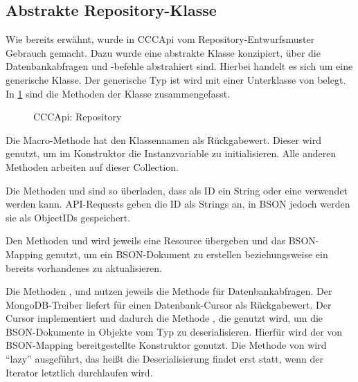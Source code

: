 \subsection{Abstrakte Repository-Klasse}
\label{ssec:ba_abstrakte_repository_klasse}

Wie bereits erwähnt, wurde in CCCApi vom Repository-Entwurfsmuster Gebrauch
gemacht.  Dazu wurde eine abstrakte Klasse  konzipiert, über
die Datenbankabfragen und -befehle abstrahiert sind.  Hierbei handelt es sich
um eine generische Klasse.  Der generische Typ  ist wird mit einer
Unterklasse von  belegt.  In
\cref{fig:cccapi_repository} sind die Methoden der Klasse zusammengefasst.

\begin{figure}
	\centering
	
	\caption{CCCApi: Repository}
	\label{fig:cccapi_repository}
\end{figure}

Die Macro-Methode  hat den Klassennamen als
Rückgabewert.  Dieser wird genutzt, um im Konstruktor die Instanzvariable
 zu initialisieren.  Alle anderen Methoden arbeiten auf
dieser Collection.

Die Methoden  und  sind so überladen, dass als ID ein
String oder eine  verwendet werden kann.  API-Requests
geben die ID als Strings an, in BSON jedoch werden sie als ObjectIDs
gespeichert.

Den Methoden  und  wird jeweils eine Resource
übergeben und das BSON-Mapping genutzt, um ein BSON-Dokument zu erstellen
beziehungsweise ein bereits vorhandenes zu aktualisieren.

Die Methoden ,  und  nutzen jeweils die
Methode  für Datenbankabfragen.  Der MongoDB-Treiber
liefert für  einen Datenbank-Cursor als Rückgabewert.  Der
Cursor implementiert  und dadurch die Methode
, die genutzt wird, um die BSON-Dokumente in Objekte vom Typ
 zu deserialisieren.  Hierfür wird der von BSON-Mapping bereitgestellte
Konstruktor  genutzt.  Die Methode 
von  wird \enquote{lazy} ausgeführt, das heißt die
Deserialisierung findet erst statt, wenn der Iterator letztlich durchlaufen
wird.
